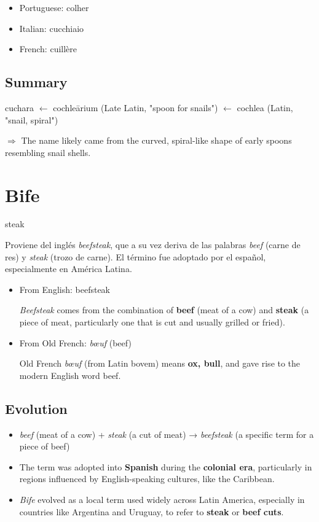 \documentclass[10pt]{book}
\newcommand{\wordentry}[2]{
	\large #1
	\vspace{-0.5em}
	\begin{etymologybox}
		#2
	\end{etymologybox}
}
\let\oldsection\section
\renewcommand{\section}[1]{
	\needspace{8\baselineskip}
	\oldsection{#1}
}
\begin{document}
	\begin{itemize}
		\item Portuguese: colher
		
		\item Italian: cucchiaio
		
		\item French: cuillère
	\end{itemize}
	
	\subsection*{Summary}
	
	cuchara $\leftarrow$ cochleārium (Late Latin, "spoon for snails") $\leftarrow$ cochlea (Latin, "snail, spiral")
	
	$\Rightarrow$ The name likely came from the curved, spiral-like shape of early spoons resembling snail shells.
	
	\section{Bife}
	\wordentry{steak}{
		Proviene del inglés \textit{beefsteak}, que a su vez deriva de las palabras \textit{beef} (carne de res) y \textit{steak} (trozo de carne). El término fue adoptado por el español, especialmente en América Latina.
		
		\begin{itemize}
			\item From English: beefsteak
			
			\textit{Beefsteak} comes from the combination of \textbf{beef} (meat of a cow) and \textbf{steak} (a piece of meat, particularly one that is cut and usually grilled or fried).
			
			\item From Old French: \textit{bœuf} (beef)
			
			Old French \textit{bœuf} (from Latin bovem) means \textbf{ox, bull}, and gave rise to the modern English word beef.
		\end{itemize}
	}
	
	\subsection*{Evolution}
	\begin{itemize}
		\item \textit{beef} (meat of a cow) + \textit{steak} (a cut of meat) → \textit{beefsteak} (a specific term for a piece of beef)
		\item The term was adopted into \textbf{Spanish} during the \textbf{colonial era}, particularly in regions influenced by English-speaking cultures, like the Caribbean.
		\item \textit{Bife} evolved as a local term used widely across Latin America, especially in countries like Argentina and Uruguay, to refer to \textbf{steak} or \textbf{beef cuts}.
	\end{itemize}
	
\end{document}
